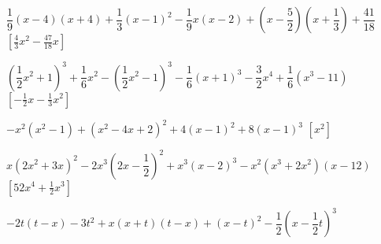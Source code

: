 \begin{esercizio}[\Ast]
\begin{enumeratea}
 \item 
\(\dfrac{1}{9}(x-4)(x+4)+\dfrac{1}{3}(x-1)^{2}-\dfrac{1}{9}x(x-2)+\left(x-\dfrac{
5}{2}\right)\left(x+\dfrac{1}{3}\right)+\dfrac{41}{18}\)
  \hfill \(\left[\frac{4}{3}x^{2}-\frac{47}{18}x\right]\)
 \item 
\(\left(\dfrac{1}{2}x^{2}+1\right)^{3}+\dfrac{1}{6}x^{2}-\left(\dfrac{1}{2}x^{2}
-1\right)^{3}-\dfrac{1}{6}(x+1)^{3}-\dfrac{3}{2}x^{4}+\dfrac{1}{6}
\left(x^3-11\right)\)
  \hfill \(\left[-{\frac{1}{2}}x-\frac{1}{3}x^{2}\right]\)
 \item 
\(-x^{2}\left(x^{2}-1\right)+\left(x^{2}-4x+2\right)^{2}+4(x-1)^{2}+8(x-1)^{3}\)
  \hfill \(\left[x^2\right]\)
 \item 
\(x\left(2x^{2}+3x\right)^{2}-2x^{3}\left(2x-\dfrac{1}{2}\right)^{2}+x^{3}(x-2)^{
3}-x^{2}\left(x^{3}+2x^{2}\right)(x-12)\)
  \hfill \(\left[52x^4+\frac{1}{2}x^3\right]\)
 \item 
\(-2t(t-x)-3t^{2}+x(x+t)(t-x)+(x-t)^{2}-\dfrac{1}{2}\left(x-\dfrac{1}{2}t\right)^
{3}\)
 \end{enumeratea}
\end{esercizio}

